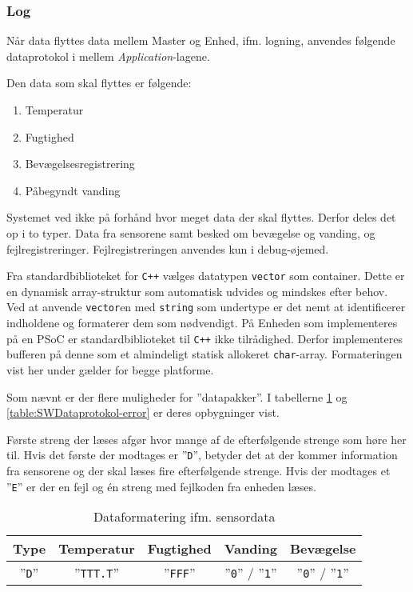 
\subsubsection{Log}

Når data flyttes data mellem Master og Enhed, ifm. logning, anvendes følgende dataprotokol i mellem \textit{Application}-lagene.

Den data som skal flyttes er følgende:

\begin{enumerate}
	\item Temperatur
	\item Fugtighed
	\item Bevægelsesregistrering
	\item Påbegyndt vanding
\end{enumerate}

Systemet ved ikke på forhånd hvor meget data der skal flyttes. Derfor deles det op i to typer. Data fra sensorene samt besked om bevægelse og vanding, og fejlregistreringer. Fejlregistreringen anvendes kun i debug-øjemed.

Fra standardbiblioteket for \verb'C++' vælges datatypen \verb+vector+ som container. Dette er en dynamisk array-struktur som automatisk udvides og mindskes efter behov.
Ved at anvende \verb+vector+en med \verb+string+ som undertype er det nemt at identificerer indholdene og formaterer dem som nødvendigt. På Enheden som implementeres på en PSoC er standardbiblioteket til \verb-C++- ikke tilrådighed. Derfor implementeres bufferen på denne som et almindeligt statisk allokeret \verb+char+-array. Formateringen vist her under gælder for begge platforme.

Som nævnt er der flere muligheder for ''datapakker''. I tabellerne \ref{table:SWDataprotokol-sensor} og \ref{table:SWDataprotokol-error} er deres opbygninger vist.

Første streng der læses afgør hvor mange af de efterfølgende strenge som høre her til. Hvis det første der modtages er ''\verb+D+'', betyder det at der kommer information fra sensorene og der skal læses fire efterfølgende strenge.
Hvis der modtages et ''\verb+E+'' er der en fejl og én streng med fejlkoden fra enheden læses.

\begin{table}[h]
	\caption{Dataformatering ifm. sensordata}
	\centering
	\begin{tabular}{|c|c|c|c|c|}
		\hline 
		\textbf{Type} & \textbf{Temperatur} & \textbf{Fugtighed} & \textbf{Vanding} & \textbf{Bevægelse}\\ 
		\hline 
		''\verb+D+'' & ''\verb+TTT.T+'' & ''\verb+FFF+'' & ''\verb+0+'' / ''\verb+1+'' & ''\verb+0+'' / ''\verb+1+'' \\ 
		\hline 
	\end{tabular} 
	\label{table:SWDataprotokol-sensor}
\end{table}


